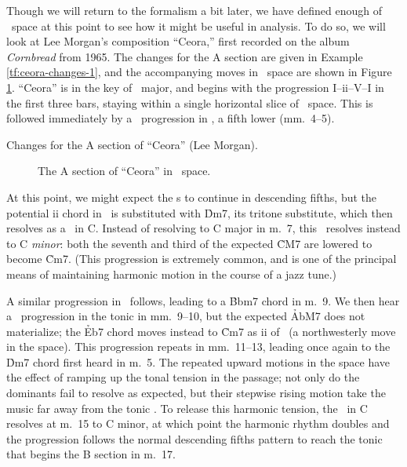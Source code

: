 
Though we will return to the formalism a bit later, we have defined enough of
\tf\ space at this point to see how it might be useful in analysis. To do so,
we will look at Lee Morgan's composition ``Ceora,'' first recorded on the
album \emph{Cornbread} from 1965. The changes for the A section are given in
Example \ref{tf:ceora-changes-1}, and the accompanying moves in \tf\ space are
shown in Figure \ref{tf:ceora-space-1}. ``Ceora'' is in the key of
\Aflat\ major, and begins with the progression I--ii--V--I in the first three
bars, staying within a single horizontal slice of \tf\ space. This is followed
immediately by a \tfo\ progression in \Dflat, a fifth lower (mm.~4--5).

\begin{example}[thbp]
  \caption{Changes for the A section of ``Ceora'' (Lee Morgan).}
  \label{tf:ceora-changes-1}
\end{example}

\begin{figure}[htbp]
  \caption{The A section of ``Ceora'' in \tf\ space.}
  \label{tf:ceora-space-1}
\end{figure}

At this point, we might expect the \tf{}s to continue in descending fifths,
but the potential ii chord in \Gflat\ is substituted with \h{Dm7}, its
tritone substitute, which then resolves as a \tf\ in C. Instead of
resolving to C major in m.~7, this \tf\ resolves instead to C \emph{minor}:
both the seventh and third of the expected \h{CM7} are lowered to become
\h{Cm7}. (This progression is extremely common, and is one of the principal
means of maintaining harmonic motion in the course of a jazz tune.)

A similar progression in \Bflat\ follows, leading to a \h{Bbm7} chord in m.~9.
We then hear a \tf\ progression in the tonic in mm.~9--10, but the
expected \h{AbM7} does not materialize; the \h{Eb7} chord moves instead to
\h{Cm7} as ii of \Bflat\ (a northwesterly move in the space). This
progression repeats in mm.~11--13, leading once again to the \h{Dm7} chord
first heard in m.~5. The repeated upward motions in the space have the
effect of ramping up the tonal tension in the passage; not only do the
dominants fail to resolve as expected, but their stepwise rising motion take
the music far away from the tonic \Aflat. To release this harmonic tension,
the \tf\ in C resolves at m.~15 to C minor, at which point the harmonic rhythm
doubles and the progression follows the normal descending fifths pattern to
reach the tonic that begins the B section in m.~17.

